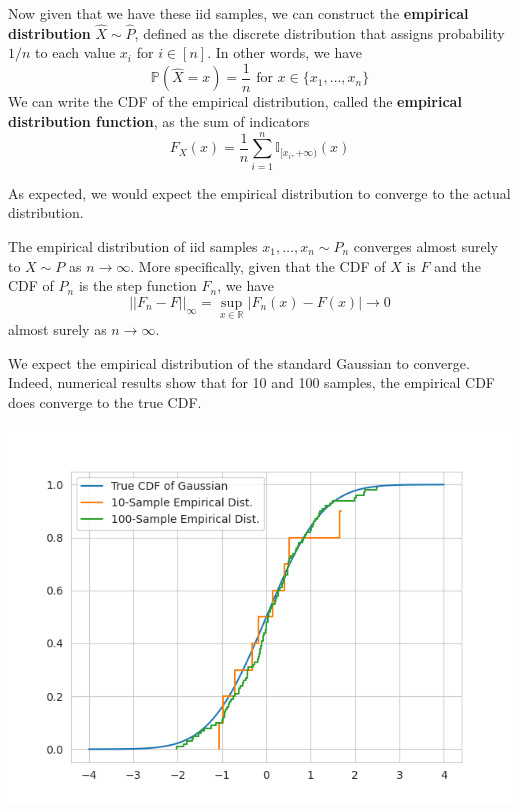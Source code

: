 \documentclass{article}
\begin{document}
    \begin{definition}
      Now given that we have these iid samples, we can construct the \textbf{empirical distribution} $\widehat{X} \sim \widehat{P}$, defined as the discrete distribution that assigns probability $1/n$ to each value $x_i$ for $i \in [n]$. In other words, we have 
      \begin{equation}
        \mathbb{P}(\widehat{X} = x) = \frac{1}{n} \text{ for } x \in \{x_1, \ldots, x_n\}
      \end{equation}
      We can write the CDF of the empirical distribution, called the \textbf{empirical distribution function}, as the sum of indicators
      \begin{equation}
        F_X (x) = \frac{1}{n} \sum_{i=1}^n \mathbb{I}_{[x_i, +\infty)} (x)
      \end{equation}
    \end{definition}

    As expected, we would expect the empirical distribution to converge to the actual distribution. 

    \begin{theorem}
      The empirical distribution of iid samples $x_1, \ldots, x_n \sim P_n$ converges almost surely to $X \sim P$ as $n \rightarrow \infty$. More specifically, given that the CDF of $X$ is $F$ and the CDF of $P_n$ is the step function $F_n$, we have 
      \begin{equation}
        ||F_n - F||_{\infty} = \sup_{x \in \mathbb{R}} |F_n (x) - F(x)| \rightarrow 0
      \end{equation}
      almost surely as $n \rightarrow \infty$. 
    \end{theorem}

    \begin{example}
      We expect the empirical distribution of the standard Gaussian to converge. Indeed, numerical results show that for 10 and 100 samples, the empirical CDF does converge to the true CDF. 

      \begin{center}
        \includegraphics[scale=0.4]{img/empirical_distribution.png}
      \end{center}
    \end{example}
\end{document}
